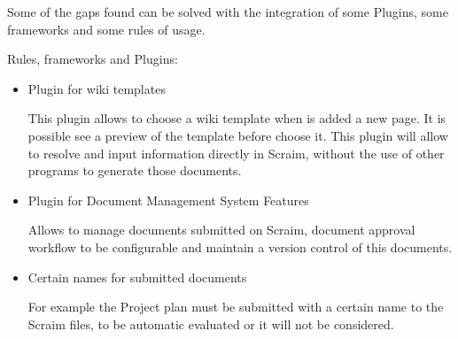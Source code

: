Some of the gaps found can be solved with the integration of some Plugins, some frameworks and some rules of usage.

Rules, frameworks and Plugins:
\begin{itemize}
	\item Plugin for wiki templates
	
	This plugin allows to choose a wiki template when is added a new page. It is possible see a preview of the template before choose it.
	This plugin will allow to resolve and input information directly in Scraim, without the use of other programs to generate those documents.
	
	\item Plugin for Document Management System Features
	
	Allows to manage documents submitted on Scraim, document approval workflow to be configurable and maintain a version control of this documents.
	
	\item Certain names for submitted documents
	
	For example the Project plan must be submitted with a certain name to the Scraim files, to be automatic evaluated or it will not be considered.
	
\end{itemize}